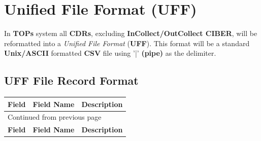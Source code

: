 \documentclass[12pt,twoside]{article}
\begin{document}
\section{Unified File Format (UFF)}
\label{sec:orgheadline35}
In \textbf{TOPs} system all \textbf{CDRs}, excluding \textbf{InCollect/OutCollect CIBER},
will be reformatted into a \emph{Unified File Format} (\textbf{UFF}). This format
will be a standard \textbf{Unix/ASCII} formatted \textbf{CSV} file using '|'
\textbf{(pipe)} as the delimiter.
\subsection{UFF File Record Format}
\label{sec:orgheadline30}
\footnotesize

\begin{longtable}{c|l|l}
\hline
\textbf{Field} & \textbf{Field Name} & \textbf{Description}\\
\hline
\endfirsthead
\multicolumn{3}{l}{Continued from previous page} \\
\hline

\textbf{Field} & \textbf{Field Name} & \textbf{Description} \\


\end{longtable}
\end{document}
